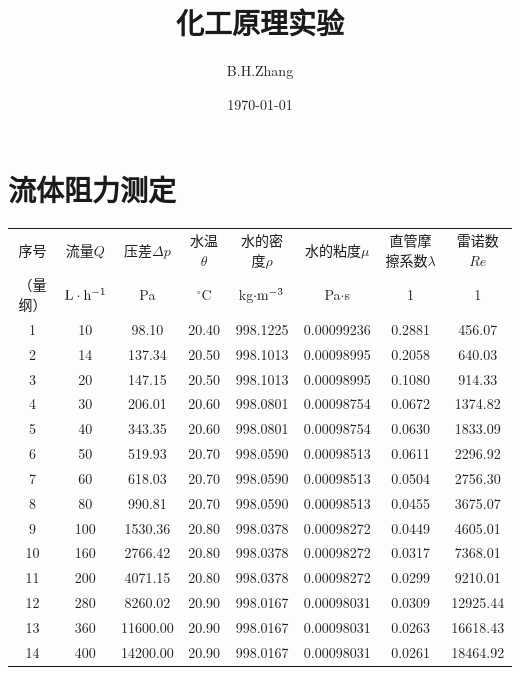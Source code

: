 \documentclass[UTF8,AutoFakeBold,a4paper]{article}
\title{\textbf{化工原理实验}}
\date{\today}
\author{B.H.Zhang}
\begin{document}
\section{流体阻力测定}


\begin{table}[h]
		\centering
		\begin{tabular}{cccccccc}
		\toprule
		
 序号 & 流量$Q$ & 压差$\Delta p$ & 水温$\theta$ & 水的密度$\rho$ & 水的粘度$\mu$ & 直管摩擦系数$\lambda$ & 雷诺数$Re$ \\ 
  （量纲）&$\rm{L}\cdot\rm{h}^{-1}$&Pa&$^{\circ}$C&kg$\cdot\rm{m}^{-3}$&Pa$\cdot$s&1&1\\
 \midrule
		1 & 10 & 98.10 & 20.40 & 998.1225 & 0.00099236 & 0.2881 & 456.07 \\ 
        2 & 14 & 137.34 & 20.50 & 998.1013 & 0.00098995 & 0.2058 & 640.03 \\ 
        3 & 20 & 147.15 & 20.50 & 998.1013 & 0.00098995 & 0.1080 & 914.33 \\ 
        4 & 30 & 206.01 & 20.60 & 998.0801 & 0.00098754 & 0.0672 & 1374.82 \\ 
        5 & 40 & 343.35 & 20.60 & 998.0801 & 0.00098754 & 0.0630 & 1833.09 \\ 
        \rowcolor{mypink}
        6 & 50 & 519.93 & 20.70 & 998.0590 & 0.00098513 & 0.0611 & 2296.92 \\ 
        \rowcolor{mypink}
        7 & 60 & 618.03 & 20.70 & 998.0590 & 0.00098513 & 0.0504 & 2756.30 \\ 
        \rowcolor{mypink}
        8 & 80 & 990.81 & 20.70 & 998.0590 & 0.00098513 & 0.0455 & 3675.07 \\ 
        9 & 100 & 1530.36 & 20.80 & 998.0378 & 0.00098272 & 0.0449 & 4605.01 \\ 
        10 & 160 & 2766.42 & 20.80 & 998.0378 & 0.00098272 & 0.0317 & 7368.01 \\ 
        11 & 200 & 4071.15 & 20.80 & 998.0378 & 0.00098272 & 0.0299 & 9210.01 \\ 
        12 & 280 & 8260.02 & 20.90 & 998.0167 & 0.00098031 & 0.0309 & 12925.44 \\ 
        13 & 360 & 11600.00 & 20.90 & 998.0167 & 0.00098031 & 0.0263 & 16618.43 \\ 
        14 & 400 & 14200.00 & 20.90 & 998.0167 & 0.00098031 & 0.0261 & 18464.92 \\ 

\end{tabular}
\end{table}
\end{document}
